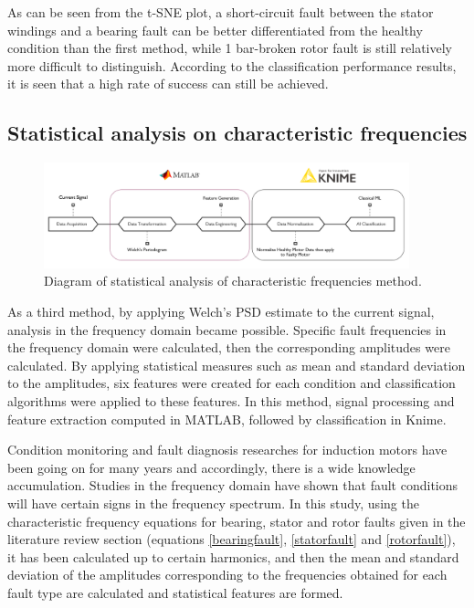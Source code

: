 As can be seen from the t-SNE plot, a short-circuit fault between the stator windings and a bearing fault can be better differentiated from the healthy condition than the first method, while 1 bar-broken rotor fault is still relatively more difficult to distinguish. According to the classification performance results, it is seen that a high rate of success can still be achieved.

\subsection{Statistical analysis on characteristic frequencies}
\begin{figure}[h]
	\centering
	\includegraphics[width=300pt,keepaspectratio=true]{./fig/method3.PNG}
	\caption{Diagram of statistical analysis of characteristic frequencies method.}	
	\label{method3}
\end{figure}
As a third method, by applying Welch's PSD estimate to the current signal, analysis in the frequency domain became possible. Specific fault frequencies in the frequency domain were calculated, then the corresponding amplitudes were calculated. By applying statistical measures such as mean and standard deviation to the amplitudes, six features were created for each condition and classification algorithms were applied to these features. In this method, signal processing and feature extraction computed in MATLAB, followed by classification in Knime.

Condition monitoring and fault diagnosis researches for induction motors have been going on for many years and accordingly, there is a wide knowledge accumulation. Studies in the frequency domain have shown that fault conditions will have certain signs in the frequency spectrum. In this study, using the characteristic frequency equations for bearing, stator and rotor faults given in the literature review section (equations \ref{bearingfault}, \ref{statorfault} and \ref{rotorfault}), it has been calculated up to certain harmonics, and then the mean and standard deviation of the amplitudes corresponding to the frequencies obtained for each fault type are calculated and statistical features are formed.


